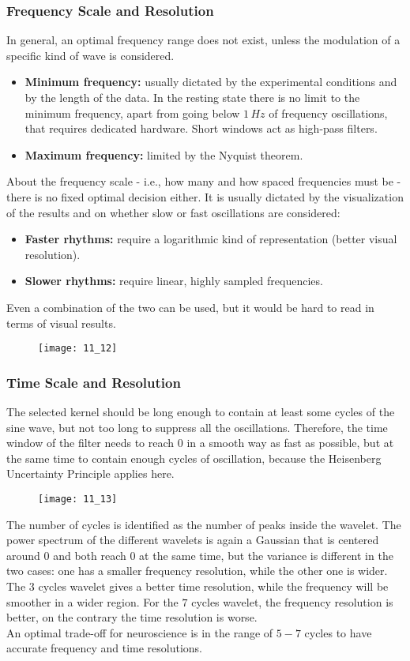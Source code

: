 \subsubsection{Frequency Scale and Resolution}
In general, an optimal frequency range does not exist, unless the modulation of a specific kind of wave is
considered.
\begin{itemize}
    \item \textbf{Minimum frequency:} usually dictated by the experimental conditions and by the length of the
    data. In the resting state there is no limit to the minimum frequency, apart from going below \(1\,Hz\)
    of frequency oscillations, that requires dedicated hardware. Short windows act as high-pass filters.
    \item \textbf{Maximum frequency:} limited by the Nyquist theorem.
\end{itemize}
About the frequency scale - i.e., how many and how spaced frequencies must be - there is no fixed optimal
decision either. It is usually dictated by the visualization of the results and on whether slow or fast
oscillations are considered:
\begin{itemize}
    \item \textbf{Faster rhythms:} require a logarithmic kind of representation (better visual resolution).
    \item \textbf{Slower rhythms:} require linear, highly sampled frequencies.
\end{itemize}
Even a combination of the two can be used, but it would be hard to read in terms of visual results.
\begin{figure}[H]
    \texttt{[image: 11\_12]}
    \centering
\end{figure}
\subsubsection{Time Scale and Resolution}
The selected kernel should be long enough to contain at least some cycles of the sine wave, but not too long
to suppress all the oscillations. Therefore, the time window of the filter needs to reach 0 in a smooth way
as fast as possible, but at the same time to contain enough cycles of oscillation, because the Heisenberg
Uncertainty Principle applies here.
\begin{figure}[H]
    \texttt{[image: 11\_13]}
    \centering
\end{figure}
The number of cycles is identified as the number of peaks inside the
wavelet. The power spectrum of the different wavelets is again a Gaussian that is centered around 0 and both
reach 0 at the same time, but the variance is different in the two cases: one has a smaller frequency
resolution, while the other one is wider. The \(3\) cycles wavelet gives a better time resolution, while the
frequency will be smoother in a wider region. For the \(7\) cycles wavelet, the frequency resolution is better, on
the contrary the time resolution is worse.\\
An optimal trade-off for neuroscience is in the range of \(5-7\) cycles to have accurate frequency and time
resolutions.
